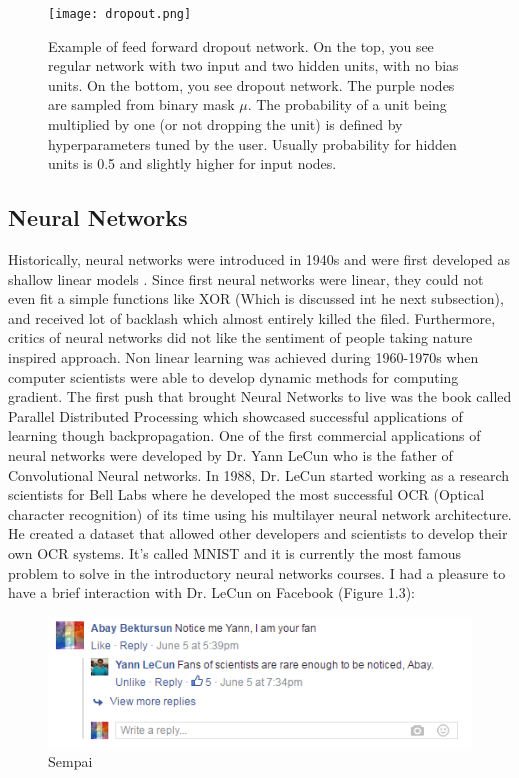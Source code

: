 \documentclass[paper=a4, fontsize=11pt]{scrartcl}
\numberwithin{equation}{section}		%
\numberwithin{figure}{section}			%
\numberwithin{table}{section}			%
\begin{document}
	\begin{figure}[!htb]
		\centering
		\texttt{[image: dropout.png]}
		\caption{Example of feed forward dropout network. On the top, you see regular network with two input and two hidden units, with no bias units. On the bottom, you see dropout network. The purple nodes are sampled from binary mask $\mu$. The probability of a unit being multiplied by one (or not dropping the unit) is defined by hyperparameters tuned by the user. Usually probability for hidden units is 0.5 and slightly higher for input nodes.}
		\label{fig:dropout}
	\end{figure}
	
	\newpage \phantom{}
	\newpage
	\subsection{Neural Networks}
	Historically, neural networks were introduced in 1940s and were first developed as shallow linear models \cite{Goodfellow-et-al-2016}. Since first neural networks were linear, they could not even fit a simple functions like XOR (Which is discussed int he next subsection), and received lot of backlash which almost entirely killed the filed. Furthermore, critics of neural networks did not like the sentiment of people taking nature inspired approach. Non linear learning was achieved during 1960-1970s when computer scientists \cite{Kelley-1960} were able to develop dynamic methods for computing gradient.
	The first push that brought Neural Networks to live was the book called Parallel Distributed Processing which showcased successful applications of learning though backpropagation.
	One of the first commercial applications of neural networks were developed by Dr. Yann LeCun who is the father of Convolutional Neural networks. In 1988, Dr. LeCun started working as a research scientists for Bell Labs where he developed the most successful OCR (Optical character recognition) of its time using his multilayer neural network architecture. He created a dataset that allowed other developers and scientists to develop their own OCR systems. It's called MNIST and it is currently the most famous problem to solve in the introductory neural networks courses. I had a pleasure to  have a brief interaction with Dr. LeCun on Facebook (Figure 1.3):
	\begin{figure}[!htb]
		\centering
		\includegraphics[scale=0.55]{sempai.PNG}
		\caption{Sempai}
		\label{fig:sempai}
	\end{figure}
\end{document}
